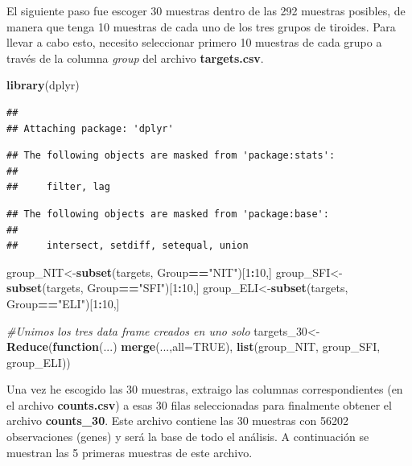 \documentclass[]{article}
\newenvironment{Shaded}{\begin{snugshade}}{\end{snugshade}}
\newcommand{\CommentTok}[1]{\textcolor[rgb]{0.56,0.35,0.01}{\textit{#1}}}
\newcommand{\ControlFlowTok}[1]{\textcolor[rgb]{0.13,0.29,0.53}{\textbf{#1}}}
\newcommand{\DataTypeTok}[1]{\textcolor[rgb]{0.13,0.29,0.53}{#1}}
\newcommand{\DecValTok}[1]{\textcolor[rgb]{0.00,0.00,0.81}{#1}}
\newcommand{\KeywordTok}[1]{\textcolor[rgb]{0.13,0.29,0.53}{\textbf{#1}}}
\newcommand{\NormalTok}[1]{#1}
\newcommand{\OperatorTok}[1]{\textcolor[rgb]{0.81,0.36,0.00}{\textbf{#1}}}
\newcommand{\OtherTok}[1]{\textcolor[rgb]{0.56,0.35,0.01}{#1}}
\newcommand{\StringTok}[1]{\textcolor[rgb]{0.31,0.60,0.02}{#1}}
\begin{document}
El siguiente paso fue escoger 30 muestras dentro de las 292 muestras
posibles, de manera que tenga 10 muestras de cada uno de los tres grupos
de tiroides. Para llevar a cabo esto, necesito seleccionar primero 10
muestras de cada grupo a través de la columna \emph{group} del archivo
\textbf{targets.csv}.

\begin{Shaded}
\begin{Highlighting}[]
\KeywordTok{library}\NormalTok{(dplyr)}
\end{Highlighting}
\end{Shaded}

\begin{verbatim}
## 
## Attaching package: 'dplyr'
\end{verbatim}

\begin{verbatim}
## The following objects are masked from 'package:stats':
## 
##     filter, lag
\end{verbatim}

\begin{verbatim}
## The following objects are masked from 'package:base':
## 
##     intersect, setdiff, setequal, union
\end{verbatim}

\begin{Shaded}
\begin{Highlighting}[]
\NormalTok{group_NIT<-}\KeywordTok{subset}\NormalTok{(targets, Group}\OperatorTok{==}\StringTok{"NIT"}\NormalTok{)[}\DecValTok{1}\OperatorTok{:}\DecValTok{10}\NormalTok{,]}
\NormalTok{group_SFI<-}\KeywordTok{subset}\NormalTok{(targets, Group}\OperatorTok{==}\StringTok{"SFI"}\NormalTok{)[}\DecValTok{1}\OperatorTok{:}\DecValTok{10}\NormalTok{,]}
\NormalTok{group_ELI<-}\KeywordTok{subset}\NormalTok{(targets, Group}\OperatorTok{==}\StringTok{"ELI"}\NormalTok{)[}\DecValTok{1}\OperatorTok{:}\DecValTok{10}\NormalTok{,]}

\CommentTok{#Unimos los tres data frame creados en uno solo}
\NormalTok{targets_}\DecValTok{30}\NormalTok{<-}\KeywordTok{Reduce}\NormalTok{(}\ControlFlowTok{function}\NormalTok{(...) }\KeywordTok{merge}\NormalTok{(...,}\DataTypeTok{all=}\OtherTok{TRUE}\NormalTok{), }\KeywordTok{list}\NormalTok{(group_NIT, group_SFI, group_ELI))}
\end{Highlighting}
\end{Shaded}

Una vez he escogido las 30 muestras, extraigo las columnas
correspondientes (en el archivo \textbf{counts.csv}) a esas 30 filas
seleccionadas para finalmente obtener el archivo \textbf{counts\_30}.
Este archivo contiene las 30 muestras con 56202 observaciones (genes) y
será la base de todo el análisis. A continuación se muestran las 5
primeras muestras de este archivo.
\end{document}
